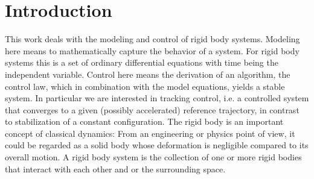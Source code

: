 \section{Introduction}



This work deals with the modeling and control of rigid body systems.
Modeling here means to mathematically capture the behavior of a system.
For rigid body systems this is a set of ordinary differential equations with time being the independent variable.
Control here means the derivation of an algorithm, the control law, which in combination with the model equations, yields a stable system.
In particular we are interested in tracking control, i.e. a controlled system that converges to a given (possibly accelerated) reference trajectory, in contrast to stabilization of a constant configuration.
The rigid body is an important concept of classical dynamics: From an engineering or physics point of view, it could be regarded as a solid body whose deformation is negligible compared to its overall motion.
A rigid body system is the collection of one or more rigid bodies that interact with each other and or the surrounding space.

